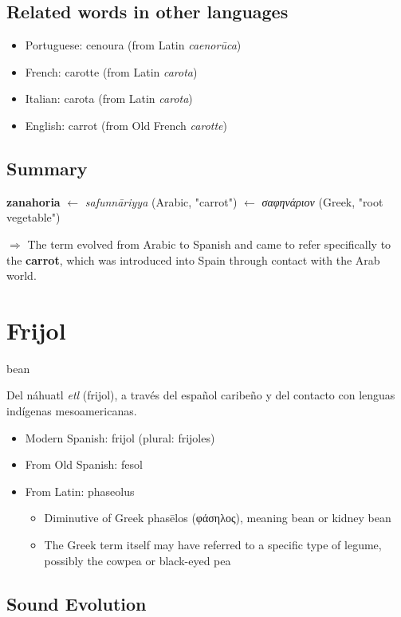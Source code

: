 \documentclass[10pt]{book}
\newcommand{\wordentry}[2]{
	\large #1
	\vspace{-0.5em}
	\begin{etymologybox}
		#2
	\end{etymologybox}
}
\let\oldsection\section
\renewcommand{\section}[1]{
	\needspace{8\baselineskip}
	\oldsection{#1}
}
\begin{document}
	\subsection*{Related words in other languages}
	\begin{itemize}
		\item Portuguese: cenoura (from Latin \textit{caenorūca})
		\item French: carotte (from Latin \textit{carota})
		\item Italian: carota (from Latin \textit{carota})
		\item English: carrot (from Old French \textit{carotte})
	\end{itemize}
	
	\subsection*{Summary}
	\textbf{zanahoria} $\leftarrow$ \textit{safunnāriyya} (Arabic, "carrot") $\leftarrow$ \textit{σαφηνάριον} (Greek, "root vegetable")
	
	$\Rightarrow$ The term evolved from Arabic to Spanish and came to refer specifically to the \textbf{carrot}, which was introduced into Spain through contact with the Arab world.

	\section{Frijol}
	\wordentry{bean}{
	Del náhuatl \textit{etl} (frijol), a través del español caribeño y del contacto con lenguas indígenas mesoamericanas.
	\begin{itemize}
		\item Modern Spanish: frijol (plural: frijoles)
		
		\item From Old Spanish: fesol
		
		\item From Latin: phaseolus
		
		\begin{itemize}
			\item Diminutive of Greek phasēlos (φάσηλος), meaning bean or kidney bean
			
			\item The Greek term itself may have referred to a specific type of legume, possibly the cowpea or black-eyed pea
		\end{itemize}
	\end{itemize}
	}
	
	\subsection{Sound Evolution}
	
\end{document}
